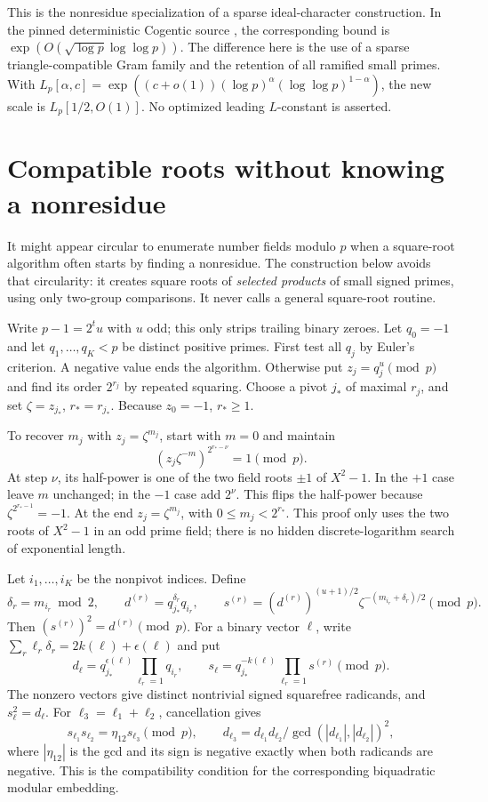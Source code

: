 This is the nonresidue specialization of a sparse ideal-character
construction.  In the pinned deterministic Cogentic source
\cite{CogDet2026}, the corresponding bound is
$\exp(O(\sqrt{\log p}\log\log p))$.
The difference here is the use of a sparse triangle-compatible Gram
family and the retention of all ramified small primes.
With
$L_p[\alpha,c]=\exp((c+o(1))(\log p)^\alpha
(\log\log p)^{1-\alpha})$, the new scale is
$L_p[1/2,O(1)]$.  No optimized leading $L$-constant is asserted.

\section{Compatible roots without knowing a nonresidue}
\label{sec:qnr-roots}

It might appear circular to enumerate number fields modulo $p$ when a
square-root algorithm often starts by finding a nonresidue.  The
construction below avoids that circularity: it creates square roots of
\emph{selected products} of small signed primes, using only two-group
comparisons.  It never calls a general square-root routine.

Write $p-1=2^tu$ with $u$ odd; this only strips trailing binary zeroes.
Let $q_0=-1$ and let $q_1,\ldots,q_K<p$ be distinct positive primes.
First test all $q_j$ by Euler's criterion.  A negative value ends the
algorithm.  Otherwise put $z_j=q_j^u\pmod p$ and find its order
$2^{r_j}$ by repeated squaring.  Choose a pivot $j_*$ of maximal
$r_j$, and set $\zeta=z_{j_*}$, $r_*=r_{j_*}$.
Because $z_0=-1$, $r_*\geq1$.

To recover $m_j$ with $z_j=\zeta^{m_j}$, start with $m=0$ and maintain
\[
 (z_j\zeta^{-m})^{2^{r_*-\nu}}=1\pmod p.
\]
At step $\nu$, its half-power is one of the two field roots $\pm1$ of
$X^2-1$.  In the $+1$ case leave $m$ unchanged; in the $-1$ case add
$2^\nu$.  This flips the half-power because
$\zeta^{2^{r_*-1}}=-1$.  At the end $z_j=\zeta^{m_j}$, with
$0\leq m_j<2^{r_*}$.
This proof only uses the two roots of $X^2-1$ in an odd prime field;
there is no hidden discrete-logarithm search of exponential length.

Let $i_1,\ldots,i_K$ be the nonpivot indices.  Define
\[
 \delta_r=m_{i_r}\bmod2,\qquad
 d^{(r)}=q_{j_*}^{\delta_r}q_{i_r},\qquad
 s^{(r)}=(d^{(r)})^{(u+1)/2}
          \zeta^{-(m_{i_r}+\delta_r)/2}\pmod p.
\]
Then $(s^{(r)})^2=d^{(r)}\pmod p$.  For a binary vector $\ell$, write
$\sum_r\ell_r\delta_r=2k(\ell)+\epsilon(\ell)$ and put
\begin{equation}
 d_\ell=q_{j_*}^{\epsilon(\ell)}\prod_{\ell_r=1}q_{i_r},
 \qquad
 s_\ell=q_{j_*}^{-k(\ell)}\prod_{\ell_r=1}s^{(r)}\pmod p.
 \label{eq:qnr-compatible-roots}
\end{equation}
The nonzero vectors give distinct nontrivial signed squarefree
radicands, and $s_\ell^2=d_\ell$.
For $\ell_3=\ell_1+\ell_2$, cancellation gives
\[
 s_{\ell_1}s_{\ell_2}=\eta_{12}s_{\ell_3}\pmod p,
 \qquad
 d_{\ell_3}=d_{\ell_1}d_{\ell_2}/\gcd(|d_{\ell_1}|,|d_{\ell_2}|)^2,
\]
where $|\eta_{12}|$ is the gcd and its sign is negative exactly when
both radicands are negative.  This is the compatibility condition for
the corresponding biquadratic modular embedding.

